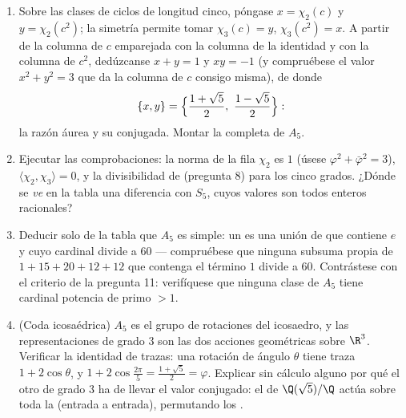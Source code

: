 \begin{problem}
\begin{enumerate}[resume]
        $\chi_2, \chi_3$ tienen grado $3$. La ortogonalidad de columnas
        (cada columna distinta de la identidad contra la columna de la
        identidad, y cada columna consigo misma) determina sus valores
        fuera de los ciclos de longitud cinco: demuéstrese que
        $\chi_2(g) = \chi_3(g) = -1$ sobre las dobles trasposiciones y
        $0$ sobre los ciclos de longitud tres. \item Sobre las clases de
        ciclos de longitud cinco, póngase $x = \chi_2(c)$ y $y =
        \chi_2(c^2)$; la simetría permite tomar $\chi_3(c) = y$,
        $\chi_3(c^2) = x$. A partir de la columna de $c$ emparejada con
        la columna de la identidad y con la columna de $c^2$, dedúzcanse
        $x + y = 1$ y $xy = -1$ (y compruébese el valor $x^2 +
        y^2 = 3$ que da la columna de $c$ consigo misma), de donde
        \[
        \{x, y\} = \Bigl\{\frac{1 + \sqrt5}2,\ \frac{1 -
        \sqrt5}2\Bigr\} :
        \]
        la razón áurea y su conjugada. Montar la
        completa de $A_5$. \item Ejecutar las comprobaciones: la norma
        de la fila $\chi_2$ es $1$ (úsese
        $\varphi^2 + \bar\varphi^2 = 3$), $\langle\chi_2,
        \chi_3\rangle = 0$, y la divisibilidad de
         (pregunta 8) para
        los cinco grados. ¿Dónde se \emph{ve} en la tabla una diferencia
        con $S_5$, cuyos valores
         son todos
        enteros racionales? \item Deducir solo de la tabla que $A_5$ es
        simple: un  es una
        unión de 
        que contiene $e$ y cuyo cardinal divide a $60$ --- compruébese
        que ninguna subsuma propia de $1 + 15 + 20 + 12 + 12$ que
        contenga el término $1$ divide a $60$. Contrástese con el
        criterio de la pregunta 11: verifíquese que ninguna clase de
        $A_5$ tiene cardinal potencia de primo $> 1$. \item (Coda
        icosaédrica) $A_5$ es el grupo de rotaciones del icosaedro, y
        las representaciones de
        grado $3$ son las dos acciones geométricas sobre $\R^3$.
        Verificar la identidad de trazas: una rotación de ángulo
        $\theta$ tiene traza $1 +
        2\cos\theta$, y $1 + 2\cos\frac{2\pi}5 =
        \frac{1+\sqrt5}2 = \varphi$. Explicar sin cálculo alguno por qué
        el otro  de
        grado $3$ ha de llevar el valor conjugado: el
         de
        $\Q(\sqrt5)/\Q$ actúa sobre toda la
        (entrada a entrada), permutando los
        .
\end{enumerate}


\end{problem}
